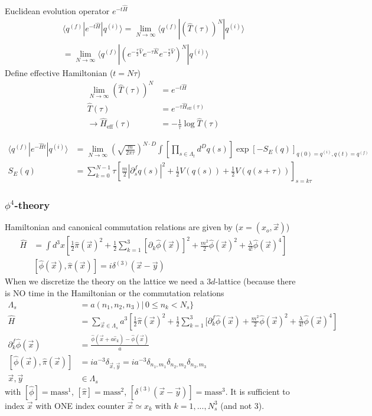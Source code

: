 \documentclass[10pt,a4paper]{article}
\theoremstyle{definition}
\begin{document}
Euclidean evolution operator $e^{-t\hat{H}}$
\begin{align}
\langle q^{(f)}|e^{-t\hat{H}}|q^{(i)}\rangle
=\lim_{N\rightarrow\infty}\langle q^{(f)}|(\hat{T}(\tau))^N|q^{(i)}\rangle\\
=\lim_{N\rightarrow\infty}\langle q^{(f)}|(e^{-\frac{\tau}{2}\hat{V}}e^{-\tau\hat{K}}e^{-\frac{\tau}{2}\hat{V}})^N|q^{(i)}\rangle
\end{align}
Define effective Hamiltonian ($t=N\tau$)
\begin{align}
\lim_{N\rightarrow\infty}(\hat{T}(\tau))^N&=e^{-t\hat{H}}\\
\hat{T}(\tau)&=e^{-\tau\hat{H}_\text{eff}(\tau)}\\
\rightarrow\hat{H}_\text{eff}(\tau)&=-\frac{1}{\tau}\log\hat{T}(\tau)
\end{align}

\begin{align}
\langle q^{(f)}|e^{-\hat{H}t}|q^{(i)}\rangle 
&=\lim_{N\rightarrow\infty}\left(\sqrt{\frac{m}{2\pi\tau}}\right)^{N\cdot D}\int\left[\prod_{s\in\Lambda_t}d^Dq(s)\right]
\exp\left[-S_E(q)\right]_{q(0)=q^{(i)},q(t)=q^{(f)}}\\
S_E(q)&=\sum_{k=0}^{N-1}\tau\left[\frac{m}{2}|\partial_s^f q(s)|^2+\frac{1}{2}V(q(s))+\frac{1}{2}V(q(s+\tau))\right]_{s=k\tau}
\end{align}

\subsubsection{$\phi^4$-theory}
Hamiltonian and canonical commutation relations are given by ($x=(x_o,\vec{x})$)
\begin{align}
\hat{H}&=\int d^3x\left[\frac{1}{2}\hat{\pi}(\vec{x})^2+\frac{1}{2}\sum_{k=1}^3[\partial_k\hat{\phi}(\vec{x})]^2+\frac{m^2}{2}\hat{\phi}(\vec{x})^2+\frac{\lambda}{4!}\hat{\phi}(\vec{x})^4\right]\\
&[\hat{\phi}(\vec{x}),\hat{\pi}(\vec{x})]=i\delta^{(3)}(\vec{x}-\vec{y})
\end{align}
When we discretize the theory on the lattice we need a $3d$-lattice (because there is NO time in the Hamiltonian or the commutation relations
\begin{align}
\Lambda_s&=a(n_1,n_2,n_3)|\,0\le n_k<N_s\}\\
\hat{H}&=\sum_{\vec{x}\in\Lambda_s}a^3\left[\frac{1}{2}\hat{\pi}(\vec{x})^2+\frac{1}{2}\sum_{k=1}^3[\partial_k^f\hat{\phi}(\vec{x})+\frac{m^2}{2}\hat{\phi}(\vec{x})^2+\frac{\lambda}{4!}\hat{\phi}(\vec{x})^4\right]\\
\partial_k^f\hat{\phi}(\vec{x})&=\frac{\hat{\phi}(\vec{x}+a\hat{e}_k)-\hat{\phi}(\vec{x})}{a}\\
[\hat{\phi}(\vec{x}),\hat{\pi}(\vec{x})]&=ia^{-3}\delta_{\vec{x},\vec{y}}=ia^{-3}\delta_{n_1,m_1}\delta_{n_2,m_2}\delta_{n_3,m_3}\\
\vec{x},\vec{y}&\in\Lambda_s
\end{align}
with $[\hat{\phi}]=\text{mass}^1$,  $[\hat{\pi}]=\text{mass}^2$, $[\delta^{(3)}(\vec{x}-\vec{y})]=\text{mass}^3$. It is sufficient to index $\vec{x}$ with ONE index counter $\vec{x}\simeq x_k$ with $k=1,...,N_s^3$ (and not 3).
\end{document}
